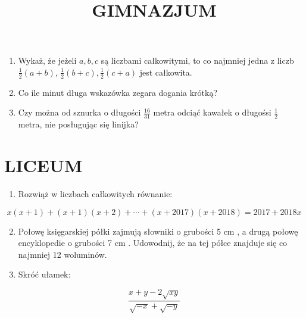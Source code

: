 \documentclass[10pt]{article}
\title{GIMNAZJUM }
\author{}
\date{}
\begin{document}
\maketitle
\begin{enumerate}
  \item Wykaż, że jeżeli \(a, b, c\) są liczbami całkowitymi, to co najmniej jedna z liczb \(\frac{1}{2}(a+b)\), \(\frac{1}{2}(b+c), \frac{1}{2}(c+a)\) jest całkowita.
  \item Co ile minut długa wskazówka zegara dogania krótką?
  \item Czy można od sznurka o długości \(\frac{16}{31}\) metra odciąć kawałek o długośsi \(\frac{1}{2}\) metra, nie posługując się linijka?
\end{enumerate}

\section*{LICEUM}
\begin{enumerate}
  \item Rozwiąż w liczbach całkowitych równanie:
\end{enumerate}

\[
x(x+1)+(x+1)(x+2)+\cdots+(x+2017)(x+2018)=2017+2018 x
\]

\begin{enumerate}
  \setcounter{enumi}{1}
  \item Połowę księgarskiej półki zajmują słowniki o grubości 5 cm , a drugą połowę encyklopedie o grubości 7 cm . Udowodnij, że na tej półce znajduje się co najmniej 12 woluminów.
  \item Skróć ułamek:
\end{enumerate}

\[
\frac{x+y-2 \sqrt{x y}}{\sqrt{-x}+\sqrt{-y}}
\]
\end{document}
